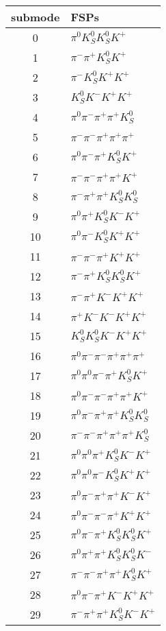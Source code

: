 \begin{table}[h!]
\begin{center}
\begin{tabular}{cl}
\hline
submode& FSPs\\
\hline
0 & $\pi^0 K_S^0 K_S^0 K^+ $ \\
1 & $\pi^- \pi^+ K_S^0 K^+ $ \\
2 & $\pi^- K_S^0 K^+ K^+ $ \\
3 & $K_S^0 K^- K^+ K^+ $ \\
4 & $\pi^0 \pi^- \pi^+ \pi^+ K_S^0 $ \\
5 & $\pi^- \pi^- \pi^+ \pi^+ \pi^+ $ \\
6 & $\pi^0 \pi^- \pi^+ K_S^0 K^+ $ \\
7 & $\pi^- \pi^- \pi^+ \pi^+ K^+ $ \\
8 & $\pi^- \pi^+ \pi^+ K_S^0 K_S^0 $ \\
9 & $\pi^0 \pi^+ K_S^0 K^- K^+ $ \\
10 & $\pi^0 \pi^- K_S^0 K^+ K^+ $ \\
11 & $\pi^- \pi^- \pi^+ K^+ K^+ $ \\
12 & $\pi^- \pi^+ K_S^0 K_S^0 K^+ $ \\
13 & $\pi^- \pi^+ K^- K^+ K^+ $ \\
14 & $\pi^+ K^- K^- K^+ K^+ $ \\
15 & $K_S^0 K_S^0 K^- K^+ K^+ $ \\
16 & $\pi^0 \pi^- \pi^- \pi^+ \pi^+ \pi^+ $ \\
17 & $\pi^0 \pi^0 \pi^- \pi^+ K_S^0 K^+ $ \\
18 & $\pi^0 \pi^- \pi^- \pi^+ \pi^+ K^+ $ \\
19 & $\pi^0 \pi^- \pi^+ \pi^+ K_S^0 K_S^0 $ \\
20 & $\pi^- \pi^- \pi^+ \pi^+ \pi^+ K_S^0 $ \\
21 & $\pi^0 \pi^0 \pi^+ K_S^0 K^- K^+ $ \\
22 & $\pi^0 \pi^0 \pi^- K_S^0 K^+ K^+ $ \\
23 & $\pi^0 \pi^- \pi^+ \pi^+ K^- K^+ $ \\
24 & $\pi^0 \pi^- \pi^- \pi^+ K^+ K^+ $ \\
25 & $\pi^0 \pi^- \pi^+ K_S^0 K_S^0 K^+ $ \\
26 & $\pi^0 \pi^+ \pi^+ K_S^0 K_S^0 K^- $ \\
27 & $\pi^- \pi^- \pi^+ \pi^+ K_S^0 K^+ $ \\
28 & $\pi^0 \pi^- \pi^+ K^- K^+ K^+ $ \\
29 & $\pi^- \pi^+ \pi^+ K_S^0 K^- K^+ $ \\

\end{tabular}
\end{center}
\end{table}
